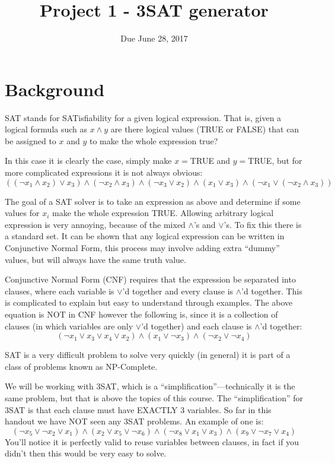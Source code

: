 \documentclass{article}
\title{Project 1 - 3SAT generator}
\author{Due June 28, 2017}
\date{}
\begin{document}
\maketitle

\section{Background}
SAT stands for SATisfiability for a given logical expression. That is, given a
logical formula such as $x \wedge y$ are there logical values (TRUE or FALSE)
that can be assigned to $x$ and $y$ to make the whole expression true?

In this case it is clearly the case, simply make $x = $TRUE and $y = $TRUE, but
for more complicated expressions it is not always obvious:
\[
  ((\neg x_1\wedge x_2)\vee x_3) \wedge (\neg x_2 \wedge x_3) \wedge (\neg x_3
  \vee x_2) \wedge (x_1 \vee x_3) \wedge (\neg x_1 \vee (\neg x_2 \wedge x_3))
\]

The goal of a SAT solver is to take an expression as above and determine if some
values for $x_i$ make the whole expression TRUE. Allowing arbitrary logical
expression is very annoying, because of the mixed $\wedge$'s and $\vee$'s. To
fix this there is a standard set. It can be shown that any logical expression
can be written in Conjunctive Normal Form, this process may involve adding extra
``dummy'' values, but will always have the same truth value.

Conjunctive Normal Form (CNF) requires that the expression be separated into
clauses, where each variable is $\vee$'d together and every clause is $\wedge$'d
together. This is complicated to explain but easy to understand through
examples. The above equation is NOT in CNF however the following is, since it is
a collection of clauses (in which variables are only $\vee$'d together) and each
clause is $\wedge$'d together:
\[
  (\neg x_1 \vee x_3 \vee x_4 \vee x_2) \wedge (x_1 \vee \neg x_3) \wedge (\neg
  x_2 \vee \neg x_4)
\]

SAT is a very difficult problem to solve very quickly (in general) it is part of
a class of problems known as NP-Complete.

We will be working with 3SAT, which is a ``simplification''---technically it is
the same problem, but that is above the topics of this course. The
``simplification'' for 3SAT is that each clause must have EXACTLY 3 variables.
So far in this handout we have NOT seen any 3SAT problems. An example of one is:
\[
  (\neg x_5 \vee \neg x_2 \vee x_1) \wedge (x_2 \vee x_5 \vee \neg x_6) \wedge 
  (\neg x_8 \vee x_1 \vee x_3) \wedge (x_9 \vee \neg x_7 \vee x_4)
\]
You'll notice it is perfectly valid to reuse variables between clauses, in fact
if you didn't then this would be very easy to solve.
\end{document}
